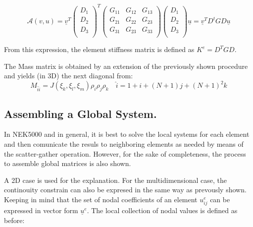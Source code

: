 \documentclass[
]{scrartcl}
\begin{document}
\begin{equation}
    \mathcal{A}(v,u)= \underline{v}^{T}
    \begin{pmatrix}
    D_1 \\
    D_2 \\
    D_3 \\
    \end{pmatrix}^{T} 
    \begin{pmatrix}
    G_{11} & G_{12} & G_{13}\\
    G_{21} & G_{22} & G_{23}\\
    G_{31} & G_{23} & G_{33}\\
    \end{pmatrix} 
    \begin{pmatrix}
    D_1 \\
    D_2 \\
    D_3 \\
    \end{pmatrix} \underline{u}=\underline{v}^{T}D^{t}GD\underline{u}
\end{equation}

From this expression, the element stiffness matrix is defined as
\(K^{e}=D^{T}GD\).

The Mass matrix is obtained by an extension of the previously shown
procedure and yields (in 3D) the next diagonal from: \begin{equation}
    M_{\hat{i}\hat{i}}= J(\xi_k,\xi_l,\xi_m)\rho_i\rho_j\rho_k \quad \hat{i}=1+i+(N+1)j+(N+1)^{2}k
\end{equation}

\hypertarget{assembling-a-global-system.}{%
\subsection{Assembling a Global
System.}\label{assembling-a-global-system.}}

In NEK5000 and in general, it is best to solve the local systems for
each element and then comunicate the resuls to neighboring elements as
needed by means of the scatter-gather operation. However, for the sake
of completeness, the process to assemble global matrices is also shown.

A 2D case is used for the explanation. For the multidimensional case,
the continouity constrain can also be expresed in the same way as
prevously shown. Keeping in mind that the set of nodal coefficients of
an element \(u^{e}_{ij}\) can be expressed in vector form
\(\underline{u}^{e}\). The local collection of nodal values is defined
as before:
\end{document}
